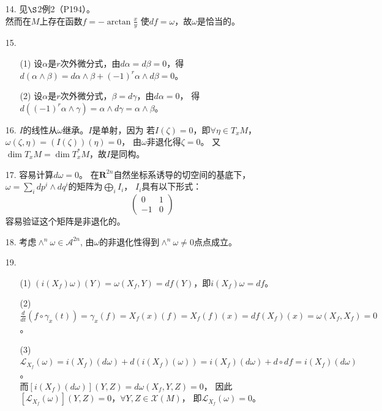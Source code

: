 \begin{itemize}
\item[14.]
    见$\S$2例2（P194）。
    \\
    然而在$M$上存在函数$f=-\operatorname{arctan}\frac{x}{y}$
    使$df=\omega$，故$\omega$是恰当的。

\item[15.]
    \begin{enumerate}
        \item[(1)]
        设$\alpha$是$r$次外微分式，由$d\alpha=d\beta=0$，得
        $d(\alpha \wedge \beta) = d\alpha \wedge \beta + (-1)^r\alpha \wedge d\beta = 0$。
        \item[(2)]
        设$\alpha$是$r$次外微分式，$\beta = d\gamma$，由$d\alpha=0$，
        得$d((-1)^r\alpha \wedge \gamma) = \alpha \wedge d\gamma = \alpha \wedge \beta$。
    \end{enumerate}

\item[16.]
    $I$的线性从$\omega$继承。$I$是单射，因为
    若$I(\zeta) = 0$，即$\forall \eta \in T_xM$，
    $\omega(\zeta,\eta) =(I(\zeta))(\eta)= 0$，
    由$\omega$非退化得$\zeta = 0$。
    又$\dim T_xM = \dim T_x^{*}M$，故$I$是同构。

\item[17.]
    容易计算$d\omega = 0$。
    在$\mathbf{R}^{2n}$自然坐标系诱导的切空间的基底下，
    $\omega = \sum\limits_i dp^i \wedge dq^i$的矩阵为$\bigoplus\limits_i I_i$，
    $I_i$具有以下形式：
    $$
        \begin{pmatrix}
            0&1\\
            -1&0
        \end{pmatrix}
    $$
    容易验证这个矩阵是非退化的。

\item[18.]
    考虑$\wedge^n \omega \in \mathscr{A}^{2n}$,
    由$\omega$的非退化性得到$\wedge^n \omega \neq 0$点点成立。

\item[19.]
    \begin{enumerate}
        \item[(1)]
        $(i(X_f)\omega)(Y) = \omega(X_f,Y) = df(Y)$，即$ i(X_f) \omega = df$。
        \item[(2)]
        $\frac{d}{dt}(f \circ \gamma _x (t)) = \gamma_x(f) = X_f(x)(f) = X_f(f)(x) = df(X_f)(x) = \omega (X_f,X_f) = 0$。
        \item[(3)]
        $\mathscr{L}_{X_f}(\omega) =i(X_f)(d\omega) + d(i(X_f)(\omega)) = i(X_f)(d\omega) + d \circ df = i(X_f)(d\omega)$。
        \\
        而$[i(X_f)(d\omega)](Y,Z) = d\omega(X_f,Y,Z) = 0$，
        因此$[\mathscr{L}_{X_f}(\omega)](Y,Z) = 0$，$\forall Y,Z \in \mathscr{X}(M)$，
        即$\mathscr{L}_{X_f}(\omega) = 0$。
    \end{enumerate}


\end{itemize}
